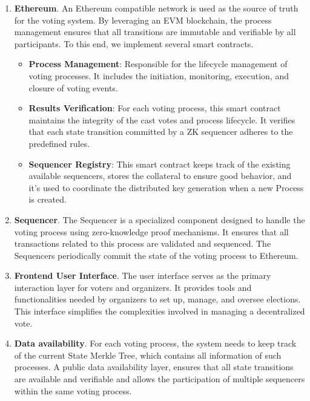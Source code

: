 \begin{enumerate}
	\item \textbf{Ethereum}. An Ethereum compatible network is used as the source of truth for the voting system. By leveraging an EVM blockchain, the process management ensures that all transitions are immutable and verifiable by all participants. To this end, we implement several smart contracts.
		\begin{itemize}
			\item \textbf{Process Management}: Responsible for the lifecycle management of voting processes. It includes the initiation, monitoring, execution, and closure of voting events.
			\item \textbf{Results Verification}: For each voting process, this smart contract maintains the integrity of the cast votes and process lifecycle. It verifies that each state transition committed by a ZK sequencer adheres to the predefined rules.			
			\item \textbf{Sequencer Registry}: This smart contract keeps track of the existing available sequencers, stores the collateral to ensure good behavior, and it's used to coordinate the distributed key generation when a new Process is created.
		\end{itemize}
	\item \textbf{Sequencer}. The Sequencer is a specialized component designed to handle the voting process using zero-knowledge proof mechanisms. It ensures that all transactions related to this process are validated and sequenced. The Sequencers periodically commit the state of the voting process to Ethereum.
	\item \textbf{Frontend User Interface}. The user interface serves as the primary interaction layer for voters and organizers. It provides tools and functionalities needed by organizers to set up, manage, and oversee elections. This interface simplifies the complexities involved in managing a decentralized vote.
	\item \textbf{Data availability}. For each voting process, the system needs to keep track of the current State Merkle Tree, which contains all information of such processes. A public data availability layer, ensures that all state transitions are available and verifiable and allows the participation of multiple sequencers within the same voting process.
\end{enumerate}

